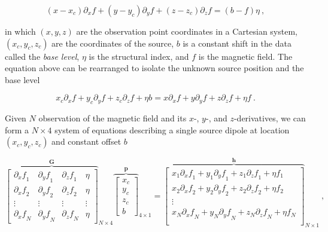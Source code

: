         \begin{equation}
        \label{eq_euler_homogeneity}
        (x - x_c)\partial_x f
        + (y - y_c)\partial_y f
        + (z - z_c)\partial_z f
        = (b - f)\eta
        \ ,
        \end{equation}
    
    \noindent
    in which $(x, y, z)$ are the observation point coordinates in a Cartesian system, $(x_c, y_c, z_c)$ are the coordinates of the source, $b$ is a constant shift in the data called the \textit{base level}, $\eta$ is the structural index, and $f$ is the magnetic field.
    The equation above can be rearranged to isolate the unknown source position  and the base level 
    
    \begin{equation}
    x_c \partial_x f + y_c \partial_y f + z_c \partial_z f + \eta b
    =
    x \partial_x f + y \partial_y f + z \partial_z f + \eta f
    \ .
    \end{equation}
    
    Given $N$ observation of the magnetic field and its $x$-, $y$-, and $z$-derivatives, we can form a $N \times 4$ system of equations describing a single source dipole at location $(x_c,y_c,z_c)$ and constant offset $b$
    
    \begin{equation}
    {\overbrace{
    \begin{bmatrix}
      {\partial_x f}_1 & {\partial_y f}_1 & {\partial_z f}_1 & \eta \\
      {\partial_x f}_2 & {\partial_y f}_2 & {\partial_z f}_2 & \eta \\
      \vdots & \vdots & \vdots & \vdots \\
      {\partial_x f}_N & {\partial_y f}_N & {\partial_z f}_N & \eta
    \end{bmatrix}
    }^{\mathbf{G}}}_{N \times 4}
    {\overbrace{
    \begin{bmatrix}
      x_c \\ y_c \\ z_c \\ b
    \end{bmatrix}
    }^{\mathbf{p}}}_{4 \times 1}
    =
    {\overbrace{
    \begin{bmatrix}
      x_1 {\partial_x f}_1 + y_1 {\partial_y f}_1 + z_1 {\partial_z f}_1 + \eta f_1 \\
      x_2 {\partial_x f}_2 + y_2 {\partial_y f}_2 + z_2 {\partial_z f}_2 + \eta f_2 \\
      \vdots \\
      x_N {\partial_x f}_N + y_N {\partial_y f}_N + z_N {\partial_z f}_N + \eta f_N \\
    \end{bmatrix}
    }^{\mathbf{h}}}_{N \times 1}
    \ ,
    \end{equation}


